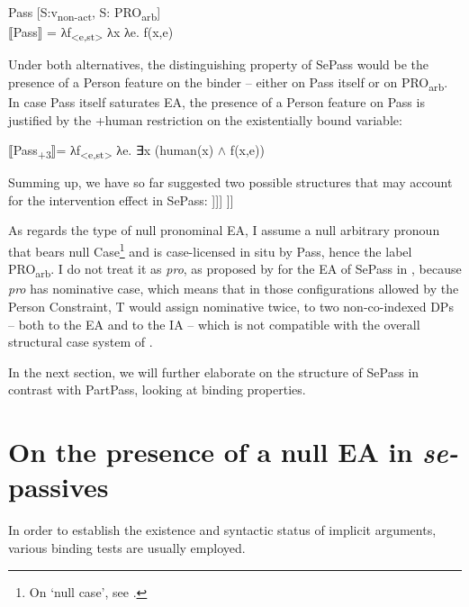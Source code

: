 \documentclass[output=paper]{langsci/langscibook}
\begin{document}
\ea%
    Pass [S:v\textsubscript{non-act}, S: PRO\textsubscript{arb}]\label{ex:giurgea:38}\\
  ⟦Pass⟧ = λf\textsubscript{<e,st>} λx λe. f(x,e)
\z
 
Under both alternatives, the distinguishing property of SePass would be the presence of a Person feature on the binder – either on Pass itself or on PRO\textsubscript{arb}. In case Pass itself saturates EA, the presence of a Person feature on Pass is justified by the +human restriction on the existentially bound variable:

\ea%
    \label{ex:giurgea:39}
⟦Pass\textsubscript{+3}⟧= λf\textsubscript{<e,st>} λe. ∃x (human(x) $\wedge$ f(x,e))
\z

Summing up, we have so far suggested two possible structures that may account for the intervention effect in SePass:
% 
\ea%
    \label{ex:giurgea:40}
    \ea\relax [\textsubscript{PassP} PRO\textsubscript{arb}\textsubscript{+Person} [Pass [\textit{\textsubscript{v}}\textsubscript{P} \textit{v} [\textsubscript{VP} V IA]]]]
    \ex\relax [\textsubscript{PassP} Pass\textsubscript{+Person} [\textit{\textsubscript{v}}\textsubscript{P} \textit{v} [\textsubscript{VP} V IA]]]
    \z
\z 

As regards the type of null pronominal EA, I assume a null arbitrary pronoun that bears null Case\footnote{On ‘null case', see \citet{Chomsky1993,Bošković1995,Bošković1997,Martin2001}.}  and is case-licensed in situ by Pass, hence the label PRO\textsubscript{arb}. I do not treat it as \textit{pro}, as proposed by \citet{MacDonald2017} for the EA of SePass in , because \textit{pro} has nominative case, which means that in those configurations allowed by the Person Constraint, T would assign nominative twice, to two non-co-indexed DPs – both to the EA and to the IA – which is not compatible with the overall structural case system of .

In the next section, we will further elaborate on the structure of SePass in contrast with PartPass, looking at binding properties.

\section{On the presence of a null EA in \textit{se-}passives}%
 
In order to establish the existence and syntactic status of implicit arguments, various binding tests are usually employed.
 
\end{document}
